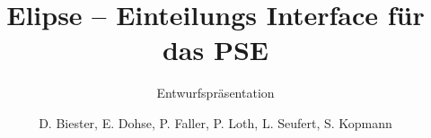\documentclass[18pt]{beamer}
\title[Elipse]{Elipse -- Einteilungs Interface für das PSE}
\subtitle{Entwurfspräsentation}
\author{D. Biester, E. Dohse, P. Faller, P. Loth, L. Seufert, S. Kopmann}
\institute{IPD Snelting}
\begin{document}

\begin{frame}
\titlepage
\end{frame}


% 
% 
% 
\end{document}
